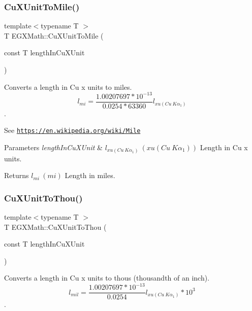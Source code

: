 \subsubsection{\texorpdfstring{Cu\+X\+Unit\+To\+Mile()}{CuXUnitToMile()}}
{\footnotesize\ttfamily template$<$typename T $>$ \\
T E\+G\+X\+Math\+::\+Cu\+X\+Unit\+To\+Mile (\begin{DoxyParamCaption}\item[{const T}]{length\+In\+Cu\+X\+Unit }\end{DoxyParamCaption})}



Converts a length in Cu x units to miles. \[ l_{mi}=\frac{1.00207697*10^{-13}}{0.0254 * 63360} l_{xu(Cu\ K\alpha_1)} \]. 

See \href{https://en.wikipedia.org/wiki/Mile}{\tt https\+://en.\+wikipedia.\+org/wiki/\+Mile} 
\begin{DoxyParams}{Parameters}
{\em length\+In\+Cu\+X\+Unit} & $ l_{xu(Cu\ K\alpha_1)}\ (xu(Cu\ K\alpha_1))$ Length in Cu x units. \\
\hline
\end{DoxyParams}
\begin{DoxyReturn}{Returns}
$ l_{mi}\ (mi)$ Length in miles. 
\end{DoxyReturn}
\mbox{\label{group___e_g_x_math-_conversions-_length_conversions-_non-_s_i-_cu_x_unit-_imperial_ga3d9558a94551b20c5492dba8f01fcff6}} 
\subsubsection{\texorpdfstring{Cu\+X\+Unit\+To\+Thou()}{CuXUnitToThou()}}
{\footnotesize\ttfamily template$<$typename T $>$ \\
T E\+G\+X\+Math\+::\+Cu\+X\+Unit\+To\+Thou (\begin{DoxyParamCaption}\item[{const T}]{length\+In\+Cu\+X\+Unit }\end{DoxyParamCaption})}



Converts a length in Cu x units to thous (thousandth of an inch). \[ l_{mil}= \frac{1.00207697*10^{-13}}{0.0254} l_{xu(Cu\ K\alpha_1)} * 10^{3} \]. 


